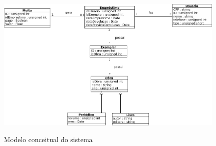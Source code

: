 \documentclass[
	12pt,				%
	openright,			%
	oneside,			%
	a4paper,			%
	english,			%
	brazil				%
	]{abntex2}
\begin{document}
\begin{figure}[H]
\includegraphics[width=1\textwidth]{modeloConceitual}
\label{fig:figura9}
\caption{\small Modelo conceitual do sistema}
\end{figure}




\postextual





\printindex
\end{document}
